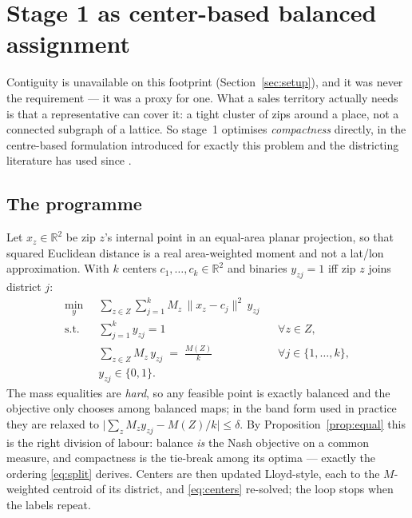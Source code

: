 \documentclass[11pt]{article}
\theoremstyle{definition}
\begin{document}
\section{Stage 1 as center-based balanced assignment}\label{sec:centers}

Contiguity is unavailable on this footprint (Section~\ref{sec:setup}), and it was never the
requirement --- it was a proxy for one. What a sales territory actually needs is that a
representative can cover it: a tight cluster of zips around a place, not a connected subgraph
of a lattice. So stage~1 optimises \emph{compactness} directly, in the centre-based
formulation \citet{hess1971} introduced for exactly this problem and the districting
literature has used since \citep{zoltners2005,riosmercado2009,duque2011}.

\subsection{The programme}

Let $x_z\in\mathbb R^2$ be zip $z$'s internal point in an equal-area planar projection, so
that squared Euclidean distance is a real area-weighted moment and not a lat/lon
approximation. With $k$ centers $c_1,\dots,c_k\in\mathbb R^2$ and binaries $y_{zj}=1$ iff
zip $z$ joins district $j$:
\begin{equation}\label{eq:centers}
\begin{aligned}
\min_{y}\;\; & \sum_{z\in Z}\sum_{j=1}^{k} M_z\,\lVert x_z-c_j\rVert^2\, y_{zj}\\
\text{s.t.}\;\;
& \sum_{j=1}^{k} y_{zj} = 1 && \forall z\in Z,\\
& \sum_{z\in Z} M_z\,y_{zj} \;=\; \frac{M(Z)}{k}
   && \forall j\in\{1,\dots,k\},\\
& y_{zj}\in\{0,1\}.
\end{aligned}
\end{equation}
The mass equalities are \emph{hard}, so any feasible point is exactly balanced and the
objective only chooses among balanced maps; in the band form used in practice they are
relaxed to $\lvert\sum_z M_z y_{zj} - M(Z)/k\rvert\le\delta$. By
Proposition~\ref{prop:equal} this is the right division of labour: balance \emph{is} the
Nash objective on a common measure, and compactness is the tie-break among its optima ---
exactly the ordering \eqref{eq:split} derives. Centers are then updated Lloyd-style, each to
the $M$-weighted centroid of its district, and \eqref{eq:centers} re-solved; the loop stops
when the labels repeat.
\end{document}
